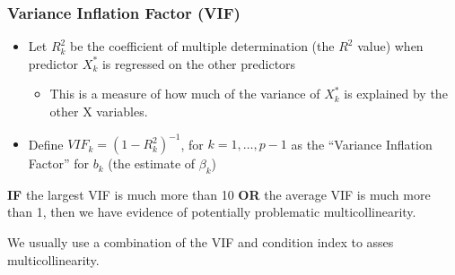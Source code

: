 \documentclass[12pt]{notes}
\begin{document}
\subsubsection{Variance Inflation Factor (VIF)}
\begin{itemize}
  \item Let $R_k^2$ be the coefficient of multiple determination (the $R^2$ value) when predictor $X^*_k$ is regressed on the other predictors
  \begin{itemize}
  \item This is a measure of how much of the variance of $X^*_k$ is explained by the other X variables. 
  \end{itemize}
   \item Define $VIF_k = (1-R_k^2)^{-1}$, for $k=1,\ldots,p-1$ as the ``Variance Inflation Factor'' for $b_k$ (the estimate of $\beta_k$)
\end{itemize}

\begin{center}
\textbf{IF} the largest VIF is much more than 10 \textbf{OR} the average VIF is much more than 1, then we have evidence of potentially problematic multicollinearity. 
\end{center}

We usually use a combination of the VIF and condition index to asses multicollinearity.
\end{document}
